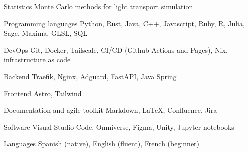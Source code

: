 

\begin{cvskills}

  \cvskill
    {Statistics}
    {Monte Carlo methods for light transport simulation}

  \cvskill
    {Programming languages}
    {Python, Rust, Java, C++, Javascript, Ruby, R, Julia, Sage, Maxima, GLSL, SQL} %

  \cvskill
    {DevOps} %
    {Git, Docker, Tailscale, CI/CD (Github Actions and Pages), Nix, infrastructure as code}

  \cvskill
    {Backend} %
    {Traefik, Nginx, Adguard, FastAPI, Java Spring} %

  \cvskill
    {Frontend} %
    {Astro, Tailwind} %

  \cvskill
    {Documentation and agile toolkit}
    {Markdown, LaTeX, Confluence, Jira}

  \cvskill
    {Software}
    {Visual Studio Code, Omniverse, Figma, Unity, Jupyter notebooks}

  \cvskill
    {Languages} %
    {Spanish (native), English (fluent), French (beginner)} %

\end{cvskills}
